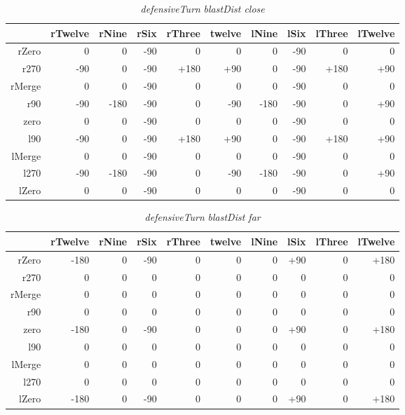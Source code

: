 \begin{table}[H]
\centering
\caption{\emph{defensiveTurn} \emph{blastDist close}}
\begin{tabular}{r|r|r|r|r|r|r|r|r|r}
 		& rTwelve 	& rNine 	& rSix 		& rThree 		& twelve 	& lNine 	& lSix 		& lThree	& lTwelve		\\ \hline
rZero	& 0			& 0			& -90		& 0 		 	& 0			& 0			& -90	 	& 0			& 0				\\
r270	& -90		& 0			& -90		& +180			& +90		& 0			& -90		& +180		& +90			\\
rMerge	& 0			& 0			& -90	 	& 0				& 0			& 0			& -90		& 0			& 0				\\
r90		& -90		& -180		& -90 		& 0				& -90		& -180		& -90		& 0			& +90			\\
zero 	& 0			& 0 		& -90 		& 0				& 0			& 0			& -90		& 0			& 0				\\
l90 	& -90		& 0 		& -90		& +180			& +90		& 0			& -90		& +180		& +90			\\
lMerge	& 0			& 0 		& -90 		& 0				& 0			& 0			& -90		& 0			& 0				\\
l270 	& -90		& -180 		& -90		& 0				& -90		& -180		& -90		& 0			& +90			\\
lZero 	& 0			& 0 		& -90	 	& 0				& 0			& 0  		& -90		& 0			& 0				
\end{tabular}
\end{table}

\begin{table}[H]
\centering
\caption{\emph{defensiveTurn} \emph{blastDist far}}
\begin{tabular}{r|r|r|r|r|r|r|r|r|r}
 		& rTwelve 	& rNine 	& rSix 		& rThree 	& twelve 	& lNine 	& lSix 		& lThree	& lTwelve	\\ \hline
rZero	& -180		& 0			& -90		& 0 	 	& 0			& 0			& +90		& 0			& +180		\\
r270	& 0			& 0			& 0			& 0			& 0			& 0			& 0			& 0			& 0			\\
rMerge	& 0			& 0			& 0	 		& 0			& 0			& 0			& 0			& 0			& 0			\\
r90		& 0			& 0			& 0 		& 0			& 0			& 0			& 0			& 0			& 0			\\
zero 	& -180		& 0 		& -90 		& 0			& 0			& 0			& +90		& 0			& +180		\\
l90 	& 0			& 0 		& 0			& 0			& 0			& 0			& 0			& 0			& 0			\\
lMerge	& 0			& 0 		& 0	 		& 0			& 0			& 0			& 0			& 0			& 0			\\
l270 	& 0			& 0	 		& 0 		& 0			& 0			& 0			& 0			& 0			& 0			\\
lZero 	& -180		& 0 		& -90 		& 0			& 0			& 0  		& +90		& 0			& +180		
\end{tabular}
\end{table}


